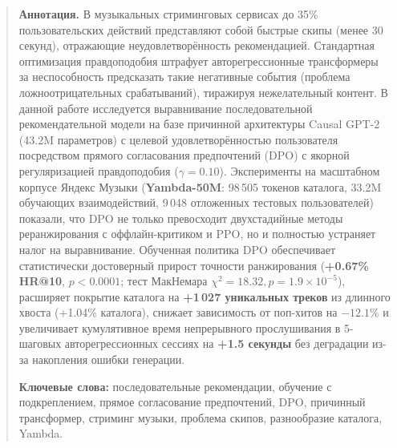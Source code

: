 \begin{abstract}
\noindent\textbf{Аннотация.} В музыкальных стриминговых сервисах до 35\% пользовательских действий представляют собой быстрые скипы (менее 30 секунд), отражающие неудовлетворённость рекомендацией. Стандартная оптимизация правдоподобия штрафует авторегрессионные трансформеры за неспособность предсказать такие негативные события (проблема ложноотрицательных срабатываний), тиражируя нежелательный контент. В данной работе исследуется выравнивание последовательной рекомендательной модели на базе причинной архитектуры Causal GPT-2 (43.2M параметров) с целевой удовлетворённостью пользователя посредством прямого согласования предпочтений (DPO) с якорной регуляризацией правдоподобия ($\gamma=0.10$). Эксперименты на масштабном корпусе Яндекс Музыки (\textbf{Yambda-50M}: 98\,505 токенов каталога, 33.2M обучающих взаимодействий, 9\,048 отложенных тестовых пользователей) показали, что DPO не только превосходит двухстадийные методы реранжирования с оффлайн-критиком и PPO, но и полностью устраняет налог на выравнивание. Обученная политика DPO обеспечивает статистически достоверный прирост точности ранжирования (\textbf{+0.67\% HR@10}, $p < 0.0001$; тест МакНемара $\chi^2 = 18.32, p = 1.9 \times 10^{-5}$), расширяет покрытие каталога на \textbf{+1\,027 уникальных треков} из длинного хвоста (+1.04\% каталога), снижает зависимость от поп-хитов на \textbf{$-12.1\%$} и увеличивает кумулятивное время непрерывного прослушивания в 5-шаговых авторегрессионных сессиях на \textbf{+1.5 секунды} без деградации из-за накопления ошибки генерации.

\vspace{0.5em}
\noindent\textbf{Ключевые слова:} последовательные рекомендации, обучение с подкреплением, прямое согласование предпочтений, DPO, причинный трансформер, стриминг музыки, проблема скипов, разнообразие каталога, Yambda.
\end{abstract}
